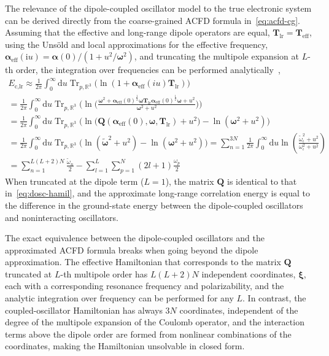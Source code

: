 The relevance of the dipole-coupled oscillator model to the true electronic system can be derived directly from the coarse-grained ACFD formula in~\eqref{eq:acfd-cg}.
Assuming that the effective and long-range dipole operators are equal, $\mathbf T_\text{lr}=\mathbf T_\text{eff}$, using the Unsöld and local approximations for the effective frequency, $\boldsymbol\alpha_\text{eff}(\mathrm iu)=\boldsymbol\alpha(0)/(1+u^2/\boldsymbol\omega^2)$, and truncating the multipole expansion at $L$-th order, the integration over frequencies can be performed analytically~\cite{TkatchenkoJCP13},
\begin{multline}
  E_\text{c,lr}
    \approx\frac1{2\pi}\int_0^\infty\mathrm du
    \operatorname{Tr}_{p,\mathbb R^3}\big(
      \ln(1+\boldsymbol\alpha_\text{eff}(iu)\mathbf T_\text{lr})
    \!\big) \\
  =\frac1{2\pi}\int_0^\infty\mathrm du
    \operatorname{Tr}_{p,\mathbb R^3}\bigg(
      \ln\Big(
        \frac
        {\boldsymbol\omega^2
          +\boldsymbol\alpha_\text{eff}(0)^{\frac12}\boldsymbol\omega
          \mathbf T_\text{lr}
          \boldsymbol\alpha_\text{eff}(0)^{\frac12}\boldsymbol\omega
          +u^2}
        {\boldsymbol\omega^2+u^2}
      \Big)
    \!\bigg) \\
  =\frac1{2\pi}\int_0^\infty\mathrm du
    \operatorname{Tr}_{p,\mathbb R^3}\big(
      \ln\big(\mathbf Q(\boldsymbol\alpha_\text{eff}(0),\boldsymbol\omega,\mathbf T_\text{lr})+u^2\big)-\ln(\boldsymbol\omega^2+u^2)\!\big) \\
  =\frac1{2\pi}\int_0^\infty\mathrm du\operatorname{Tr}_{p,\mathbb R^3}\big(\ln(\tilde{\boldsymbol\omega}^2+u^2)-\ln(\boldsymbol\omega^2+u^2)\!\big)
  =\sum_{n=1}^{3N}\frac1{2\pi}\int_0^\infty\mathrm du\ln\left(\frac{\tilde\omega_\iota^2+u^2}{\omega_\iota^2+u^2}\right) \\
  =\sum_{n=1}^{L(L+2)N}\frac{\tilde\omega_n}2-\sum_{l=1}^L\sum_{p=1}^N(2l+1)\frac{\omega_p}2
\label{eq:mbd-rpa}
\end{multline}
When truncated at the dipole term ($L=1$), the matrix $\mathbf Q$ is identical to that in~\eqref{eq:dosc-hamil}, and the approximate long-range correlation energy is equal to the difference in the ground-state energy between the dipole-coupled oscillators and noninteracting oscillators.

The exact equivalence between the dipole-coupled oscillators and the approximated ACFD formula breaks when going beyond the dipole approximation.
The effective Hamiltonian that corresponds to the matrix $\mathbf Q$ truncated at $L$-th multipole order has $L(L+2)N$ independent coordinates, $\boldsymbol\xi$, each with a corresponding resonance frequency and polarizability, and the analytic integration over frequency can be performed for any $L$.
In contrast, the coupled-oscillator Hamiltonian has always $3N$ coordinates, independent of the degree of the multipole expansion of the Coulomb operator, and the interaction terms above the dipole order are formed from nonlinear combinations of the coordinates, making the Hamiltonian unsolvable in closed form.

